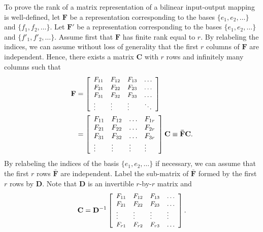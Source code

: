 \documentclass[12pt,onecolumn,draftcls]{IEEEtran}
\begin{document}
To prove the rank of a matrix representation of a bilinear input-output mapping is well-defined, let
$\mathbf{F}$ be a representation corresponding to the bases $\{e_1, e_2, \ldots \}$
and $\{f_1, f_2, \ldots \}$.  Let $\mathbf{F}'$ be a representation corresponding to the bases $\{ e_1, e_2, \ldots \}$
and $\{ f'_1, f'_2, \ldots \}$.  Assume first that $\mathbf{F}$ has finite rank equal to $r$.
By relabeling the indices, we can assume without loss of generality that the first $r$ columns of $\mathbf{F}$
are independent.  Hence, there exists a matrix $\mathbf{C}$ with $r$ rows and infinitely many columns such that
\begin{align}
\mathbf{F} &=
\left[
\small
\begin{array}{llll}
F_{11} & F_{12} & F_{13} &  \ldots \\
F_{21} & F_{22}  & F_{23} &  \ldots\\
F_{31} & F_{32} & F_{33} &  \ldots \\
\vdots & \vdots & \vdots & \ddots\\
\end{array}
\right]\\
&= \left[
\begin{array}{llll}
F_{11} & F_{12} &  \ldots & F_{1r}\\
F_{21} & F_{22} &  \ldots & F_{2r}\\
F_{31} & F_{32} &  \ldots & F_{3r}\\
\vdots & \vdots & \vdots & \vdots\\
\end{array}
\right] \mathbf{C} \equiv \mathbf{\bar{F}}\mathbf{C} .
\end{align}
By relabeling the indices of the basis $\{e_1, e_2, \ldots \}$ if necessary, we can assume that the
first $r$ rows $\mathbf{\bar{F}}$ are independent.  Label the sub-matrix of $\mathbf{\bar{F}}$ formed by
the first $r$ rows by $\mathbf{D}$.  Note that $\mathbf{D}$ is an invertible $r$-by-$r$ matrix and
\begin{equation}
\mathbf{C}=
\mathbf{D}^{-1} \left[
\small
\begin{array}{llll}
F_{11} & F_{12} & F_{13} &  \ldots \\
F_{21} & F_{22}  & F_{23} &  \ldots\\
\vdots & \vdots & \vdots & \vdots\\
F_{r1} & F_{r2} & F_{r3} &  \ldots \\
\end{array}
\right].
\end{equation}
\end{document}
